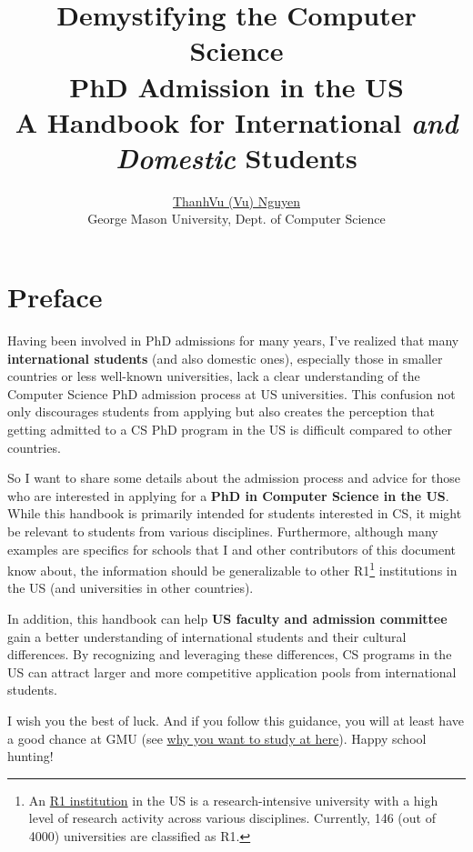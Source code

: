 \documentclass[oneside,11pt]{memoir}
\title{Demystifying the Computer Science \\
  PhD Admission in the US\\{\large A Handbook for International \emph{and Domestic} Students}}
\author{\href{https://nguyenthanhvuh.github.io}{ThanhVu (Vu) Nguyen}\\{\small George Mason University, Dept. of Computer Science}}
\makeatletter
\def\maketitle{%
  \null
  \thispagestyle{empty}%
  \vfill
  \begin{center}\leavevmode
    \normalfont
    {\LARGE\raggedright \textbf{\@title}\par}%
    \vfill%
    {\Large \@author\par}%
    \vfill%
    {\large\raggedleft \@date\par}%
  \end{center}%
  \vfill
  \null
  \cleardoublepage
}
\makeatother
\begin{document}
\maketitle
\frontmatter

\chapter{Preface}
Having been involved in PhD admissions for many years, I've
realized that many \textbf{international students} (and also domestic ones), especially those in  smaller countries or less well-known universities, lack a clear understanding of
the Computer Science PhD admission process at US universities. This confusion not only
discourages students from applying but also creates the perception that
getting admitted to a CS PhD program in the US is difficult compared to other countries.

So I want to share some details about the admission process and advice for those who are interested in applying for a \textbf{PhD in Computer Science in the US}.
While this handbook is primarily intended for students interested in CS, it might be relevant to students from various disciplines.
Furthermore, although many examples are specifics for schools that I and other contributors of this document know about, the information should be generalizable to other R1\footnote{An \href{https://en.wikipedia.org/wiki/List_of_research_universities_in_the_United_States}{R1 institution} in the US is a research-intensive university with a high level of research activity across various disciplines. Currently, 146 (out of 4000) universities are classified as R1.} institutions in the US (and universities in other countries).

In addition, this handbook can help \textbf{US faculty and admission committee} gain a better understanding of international students and their cultural differences.  By recognizing and leveraging these differences, CS programs in the US can attract larger and more competitive application pools from international students.

I wish you the best of luck. And if you follow this guidance, you will at least have a good chance at GMU (see
\href{https://github.com/dynaroars/dynaroars.github.io/wiki/About-GMU}{why
  you want to study at here}). Happy school hunting!
\end{document}
